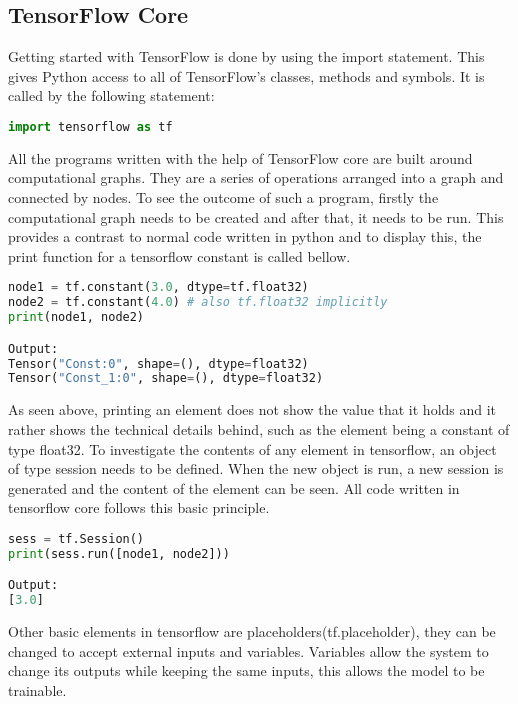 \subsection{TensorFlow Core}
Getting started with TensorFlow is done by using the import statement. 
This gives Python access to all of TensorFlow's classes,
methods and symbols. It is called by the following statement:
\begin{lstlisting}[language=Python, caption=Importing Tensorflow library.]
import tensorflow as tf
\end{lstlisting}
All the programs written with the help of TensorFlow core are built around computational graphs. 
They are a series of operations arranged into a graph and connected by nodes. 
To see the outcome of such a program, 
firstly the computational graph needs to be created and after that, it needs to be run. 
This provides a contrast to normal code written in python and to display this, 
the print function for a tensorflow constant is called bellow.
\begin{lstlisting}[language=Python, caption=Printing output without sess.run().]
node1 = tf.constant(3.0, dtype=tf.float32)
node2 = tf.constant(4.0) # also tf.float32 implicitly
print(node1, node2)

Output:
Tensor("Const:0", shape=(), dtype=float32)
Tensor("Const_1:0", shape=(), dtype=float32) 
\end{lstlisting}
As seen above, printing an element does not show the value that it holds and it rather shows the technical details behind,
such as the element being a constant of type float32.
To investigate the contents of any element in tensorflow,
an object of type session needs to be defined.
When the new object is run, a new session is generated and the content of the element can be seen.
All code written in tensorflow core follows this basic principle.
\begin{lstlisting}[language=Python, caption=Printing output with sess.run().]
sess = tf.Session()
print(sess.run([node1, node2]))

Output:
[3.0]
\end{lstlisting}
Other basic elements in tensorflow are
placeholders(tf.placeholder), they can be changed to accept external inputs and variables. Variables allow the system to
change its outputs while keeping the same inputs,
this allows the model to be trainable. 

